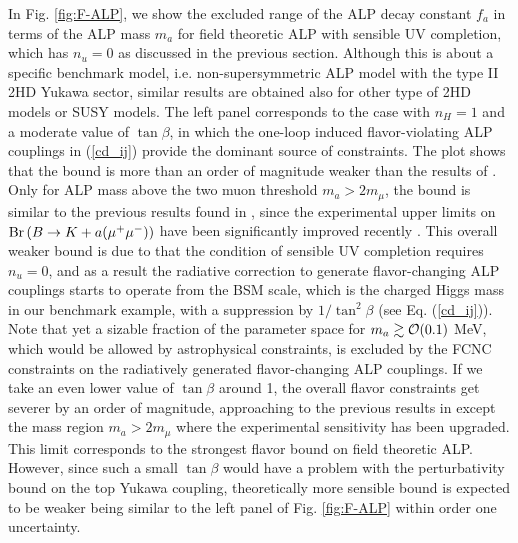 \documentclass[preprint,prd,aps,tighten,nofootinbib,amssymb]{revtex4}
\begin{document}
In Fig. \ref{fig:F-ALP}, we show the excluded range of the ALP decay constant $f_a$ in terms of the ALP mass $m_a$
for field theoretic ALP with  sensible UV completion, which has $n_u=0$ as discussed   in the previous section.
Although this is about a specific benchmark model, i.e. non-supersymmetric ALP model with the type II 2HD Yukawa sector, similar results are obtained also for other type of 2HD models  or SUSY models. 
The left panel corresponds to the case with $n_H=1$ and a moderate value of $\tan\beta$, in which the one-loop induced flavor-violating ALP couplings in (\ref{cd_ij})  provide the dominant source of constraints. 
The plot shows that the bound is more than an order of magnitude weaker than the results of \cite{Dolan:2014ska}. Only for ALP mass above the two muon threshold $m_a > 2m_\mu$, the bound is similar to the previous results found in  \cite{Batell:2009jf, Dolan:2014ska}, since the experimental upper limits on ${\rm Br}\left(B \rightarrow K + a (\mu^+ \mu^-)\right)$ have been significantly improved recently \cite{Aaij:2015tna, Aaij:2016qsm}.
This overall weaker bound is  due to that the condition of sensible UV completion requires $n_u=0$, and as a result the radiative correction to generate flavor-changing ALP couplings starts to operate from the 
BSM scale, which is the charged Higgs mass in our benchmark example, with a suppression by $1/\tan^2\beta$ (see Eq. (\ref{cd_ij})). 
Note that yet a sizable fraction of the parameter space for $m_a\gtrsim {\cal O}(0.1)$ MeV, which would be allowed by astrophysical  constraints, is excluded by the FCNC constraints on the radiatively generated flavor-changing ALP couplings.
If we take an even lower value of $\tan\beta$ around 1, the overall flavor constraints get severer by an order of magnitude, 
 approaching to the previous results in \cite{Dolan:2014ska} except the mass region $m_a > 2m_\mu$ where the experimental sensitivity has been upgraded. 
 This limit corresponds to the strongest flavor bound on field theoretic ALP. 
However, since such a small $\tan \beta$ would have a problem with the perturbativity bound on the top Yukawa coupling, theoretically more sensible bound is expected to be weaker
being similar to the left panel of Fig. \ref{fig:F-ALP} within order one uncertainty.
\end{document}
